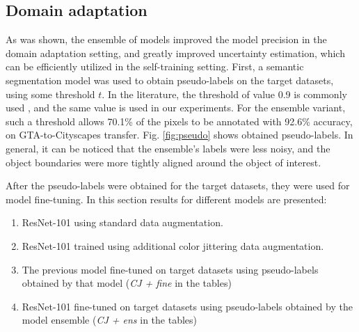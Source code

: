 \documentclass[conference]{IEEEtran}
\begin{document}

\subsection{Domain adaptation}
As was shown, the ensemble of models improved the model precision in the domain adaptation setting, and greatly improved uncertainty estimation, which can be efficiently utilized in the self-training setting. First, a semantic segmentation model was used to obtain pseudo-labels on the target datasets, using some threshold $t$. In the literature, the threshold of value 0.9 is commonly used \cite{textureinvariant}, and the same value is used in our experiments. For the ensemble variant, such a threshold allows 70.1\% of the pixels to be annotated with 92.6\% accuracy, on GTA-to-Cityscapes transfer. Fig. \ref{fig:pseudo} shows obtained pseudo-labels. In general, it can be noticed that the ensemble's labels were less noisy, and the object boundaries were more tightly aligned around the object of interest.


After the pseudo-labels were obtained for the target datasets, they were used for model fine-tuning. In this section results for different models are presented:
\begin{enumerate}
    \item ResNet-101 using standard data augmentation.
    \item ResNet-101 trained using additional color jittering data augmentation. 
    \item The previous model fine-tuned on target datasets using pseudo-labels obtained by that model (\textit{CJ + fine} in the tables)
    \item ResNet-101 fine-tuned on target datasets using pseudo-labels obtained by the model ensemble (\textit{CJ + ens} in the tables)
\end{enumerate}
\end{document}
